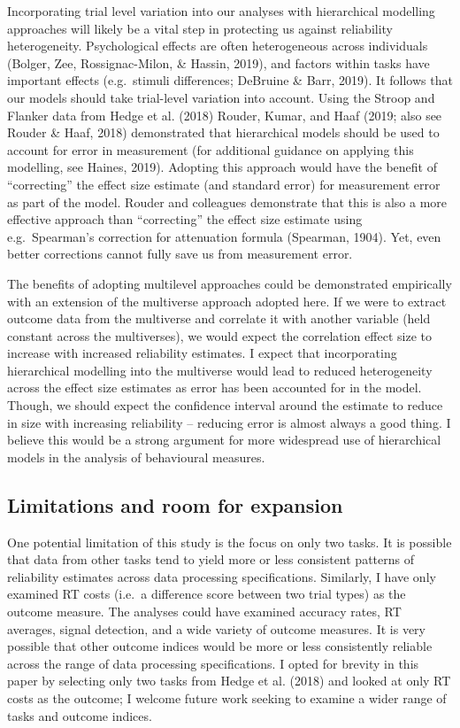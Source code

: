 \documentclass[english,man,floatsintext]{apa6}
\begin{document}
Incorporating trial level variation into our analyses with hierarchical modelling approaches will likely be a vital step in protecting us against reliability heterogeneity. Psychological effects are often heterogeneous across individuals (Bolger, Zee, Rossignac-Milon, \& Hassin, 2019), and factors within tasks have important effects (e.g.~stimuli differences; DeBruine \& Barr, 2019). It follows that our models should take trial-level variation into account. Using the Stroop and Flanker data from Hedge et al. (2018) Rouder, Kumar, and Haaf (2019; also see Rouder \& Haaf, 2018) demonstrated that hierarchical models should be used to account for error in measurement (for additional guidance on applying this modelling, see Haines, 2019). Adopting this approach would have the benefit of \enquote{correcting} the effect size estimate (and standard error) for measurement error as part of the model. Rouder and colleagues demonstrate that this is also a more effective approach than \enquote{correcting} the effect size estimate using e.g.~Spearman's correction for attenuation formula (Spearman, 1904). Yet, even better corrections cannot fully save us from measurement error.

The benefits of adopting multilevel approaches could be demonstrated empirically with an extension of the multiverse approach adopted here. If we were to extract outcome data from the multiverse and correlate it with another variable (held constant across the multiverses), we would expect the correlation effect size to increase with increased reliability estimates. I expect that incorporating hierarchical modelling into the multiverse would lead to reduced heterogeneity across the effect size estimates as error has been accounted for in the model. Though, we should expect the confidence interval around the estimate to reduce in size with increasing reliability -- reducing error is almost always a good thing. I believe this would be a strong argument for more widespread use of hierarchical models in the analysis of behavioural measures.

\hypertarget{limitations-and-room-for-expansion}{%
\subsection{Limitations and room for expansion}\label{limitations-and-room-for-expansion}}

One potential limitation of this study is the focus on only two tasks. It is possible that data from other tasks tend to yield more or less consistent patterns of reliability estimates across data processing specifications. Similarly, I have only examined RT costs (i.e.~a difference score between two trial types) as the outcome measure. The analyses could have examined accuracy rates, RT averages, signal detection, and a wide variety of outcome measures. It is very possible that other outcome indices would be more or less consistently reliable across the range of data processing specifications. I opted for brevity in this paper by selecting only two tasks from Hedge et al. (2018) and looked at only RT costs as the outcome; I welcome future work seeking to examine a wider range of tasks and outcome indices.
\end{document}
